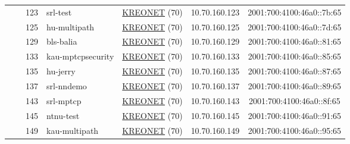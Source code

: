 \begin{small}
\begin{center}
\begin{longtable}{|c|c|c|c|c|c|c|c|}
  &  & \tiny{123} & \multicolumn{1}{|l|}{\tiny{srl-test}} & \multicolumn{2}{|c|}{\tiny{\href{http://www.kreonet.net}{KREONET} (70)}} & \tiny{10.70.160.123} & \tiny{2001:700:4100:46a0::7b:65} \\* \cline{3-3}\cline{4-4}\cline{5-5}\cline{6-6}\cline{7-7}\cline{8-8}
  &  & \tiny{125} & \multicolumn{1}{|l|}{\tiny{hu-multipath}} & \multicolumn{2}{|c|}{\tiny{\href{http://www.kreonet.net}{KREONET} (70)}} & \tiny{10.70.160.125} & \tiny{2001:700:4100:46a0::7d:65} \\* \cline{3-3}\cline{4-4}\cline{5-5}\cline{6-6}\cline{7-7}\cline{8-8}
  &  & \tiny{129} & \multicolumn{1}{|l|}{\tiny{bls-balia}} & \multicolumn{2}{|c|}{\tiny{\href{http://www.kreonet.net}{KREONET} (70)}} & \tiny{10.70.160.129} & \tiny{2001:700:4100:46a0::81:65} \\* \cline{3-3}\cline{4-4}\cline{5-5}\cline{6-6}\cline{7-7}\cline{8-8}
  &  & \tiny{133} & \multicolumn{1}{|l|}{\tiny{kau-mptcpsecurity}} & \multicolumn{2}{|c|}{\tiny{\href{http://www.kreonet.net}{KREONET} (70)}} & \tiny{10.70.160.133} & \tiny{2001:700:4100:46a0::85:65} \\* \cline{3-3}\cline{4-4}\cline{5-5}\cline{6-6}\cline{7-7}\cline{8-8}
  &  & \tiny{135} & \multicolumn{1}{|l|}{\tiny{hu-jerry}} & \multicolumn{2}{|c|}{\tiny{\href{http://www.kreonet.net}{KREONET} (70)}} & \tiny{10.70.160.135} & \tiny{2001:700:4100:46a0::87:65} \\* \cline{3-3}\cline{4-4}\cline{5-5}\cline{6-6}\cline{7-7}\cline{8-8}
  &  & \tiny{137} & \multicolumn{1}{|l|}{\tiny{srl-nndemo}} & \multicolumn{2}{|c|}{\tiny{\href{http://www.kreonet.net}{KREONET} (70)}} & \tiny{10.70.160.137} & \tiny{2001:700:4100:46a0::89:65} \\* \cline{3-3}\cline{4-4}\cline{5-5}\cline{6-6}\cline{7-7}\cline{8-8}
  &  & \tiny{143} & \multicolumn{1}{|l|}{\tiny{srl-mptcp}} & \multicolumn{2}{|c|}{\tiny{\href{http://www.kreonet.net}{KREONET} (70)}} & \tiny{10.70.160.143} & \tiny{2001:700:4100:46a0::8f:65} \\* \cline{3-3}\cline{4-4}\cline{5-5}\cline{6-6}\cline{7-7}\cline{8-8}
  &  & \tiny{145} & \multicolumn{1}{|l|}{\tiny{ntnu-test}} & \multicolumn{2}{|c|}{\tiny{\href{http://www.kreonet.net}{KREONET} (70)}} & \tiny{10.70.160.145} & \tiny{2001:700:4100:46a0::91:65} \\* \cline{3-3}\cline{4-4}\cline{5-5}\cline{6-6}\cline{7-7}\cline{8-8}
  &  & \tiny{149} & \multicolumn{1}{|l|}{\tiny{kau-multipath}} & \multicolumn{2}{|c|}{\tiny{\href{http://www.kreonet.net}{KREONET} (70)}} & \tiny{10.70.160.149} & \tiny{2001:700:4100:46a0::95:65} \\* \cline{3-3}\cline{4-4}\cline{5-5}\cline{6-6}\cline{7-7}\cline{8-8}

\end{longtable}
\end{center}
\end{small}
